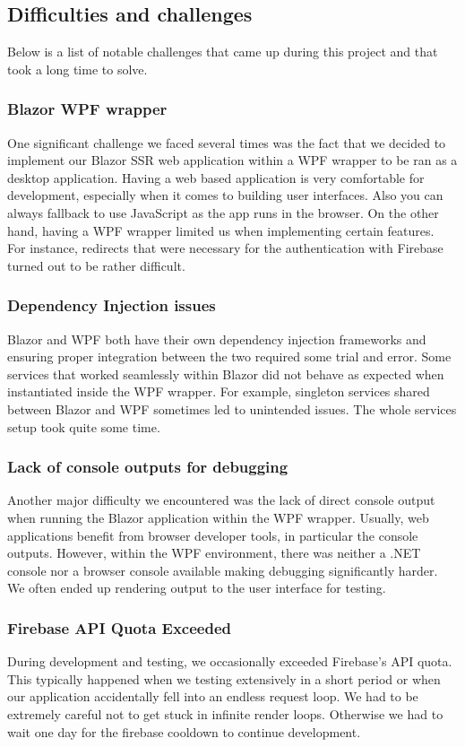 \documentclass{article}
\begin{document}
\subsection{Difficulties and challenges}
Below is a list of notable challenges that came up during this project and that took a long time to solve.

\subsubsection{Blazor WPF wrapper}
One significant challenge we faced several times was the fact that we decided to implement our Blazor SSR web application within a WPF wrapper to be ran as a desktop application.
Having a web based application is very comfortable for development, especially when it comes to building user interfaces. Also you can always fallback to use JavaScript as the app runs in the browser.
On the other hand, having a WPF wrapper limited us when implementing certain features.\\
For instance, redirects that were necessary for the authentication with Firebase turned out to be rather difficult.

\subsubsection{Dependency Injection issues}
Blazor and WPF both have their own dependency injection frameworks and ensuring proper integration between the two required some trial and error.
Some services that worked seamlessly within Blazor did not behave as expected when instantiated inside the WPF wrapper.
For example, singleton services shared between Blazor and WPF sometimes led to unintended issues.
The whole services setup took quite some time.

\subsubsection{Lack of console outputs for debugging}
Another major difficulty we encountered was the lack of direct console output when running the Blazor application within the WPF wrapper.
Usually, web applications benefit from browser developer tools, in particular the console outputs.
However, within the WPF environment, there was neither a .NET console nor a browser console available making debugging significantly harder.
We often ended up rendering output to the user interface for testing.

\subsubsection{Firebase API Quota Exceeded}
During development and testing, we occasionally exceeded Firebase's API quota.
This typically happened when we testing extensively in a short period or when our application accidentally fell into an endless request loop.
We had to be extremely careful not to get stuck in infinite render loops.
Otherwise we had to wait one day for the firebase cooldown to continue development.
\end{document}
